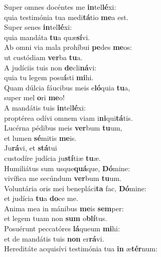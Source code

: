 \oddverse Super omnes docéntes me \textbf{in}tel\textbf{lé}xi:~\*\\
\oddverse quia testimónia tua medi\textbf{tá}tio \textbf{me}a est.\\
\evenverse Super senes \textbf{in}tel\textbf{lé}xi:~\*\\
\evenverse quia mandáta \textbf{tu}a quæ\textbf{sí}vi.\\
\oddverse Ab omni via mala prohíbui \textbf{pe}des \textbf{me}os:~\*\\
\oddverse ut custódiam \textbf{ver}ba \textbf{tu}a.\\
\evenverse A judíciis tuis non \textbf{de}cli\textbf{ná}vi:~\*\\
\evenverse quia tu legem posu\textbf{í}sti \textbf{mi}hi.\\
\oddverse Quam dúlcia fáucibus meis e\textbf{ló}quia \textbf{tu}a,~\*\\
\oddverse super mel \textbf{o}ri \textbf{me}o!\\
\evenverse A mandátis tuis \textbf{in}tel\textbf{lé}xi:~\*\\
\evenverse proptérea odívi omnem viam i\textbf{ni}qui\textbf{tá}tis.\\
\oddverse Lucérna pédibus meis \textbf{ver}bum \textbf{tu}um,~\*\\
\oddverse et lumen \textbf{sé}mitis \textbf{me}is.\\
\evenverse Ju\textbf{rá}vi, et \textbf{stá}tui~\*\\
\evenverse custodíre judícia ju\textbf{stí}tiæ \textbf{tu}æ.\\
\oddverse Humiliátus sum usque\textbf{quá}que, \textbf{Dó}mine:~\*\\
\oddverse vivífica me secúndum \textbf{ver}bum \textbf{tu}um.\\
\evenverse Voluntária oris mei benepláci\textbf{ta} fac, \textbf{Dó}mine:~\*\\
\evenverse et judícia \textbf{tu}a \textbf{do}ce me.\\
\oddverse Anima mea in mánibus \textbf{me}is \textbf{sem}per:~\*\\
\oddverse et legem tuam non \textbf{sum} o\textbf{blí}tus.\\
\evenverse Posuérunt peccatóres \textbf{lá}queum \textbf{mi}hi:~\*\\
\evenverse et de mandátis tuis \textbf{non} er\textbf{rá}vi.\\
\oddverse Hereditáte acquisívi testimónia tua \textbf{in} æ\textbf{tér}num:~\*\\
